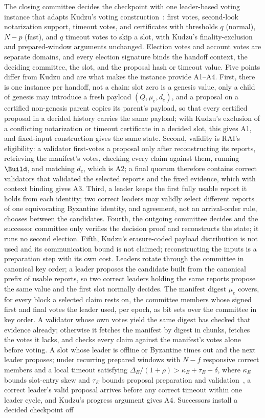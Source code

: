 The closing committee decides the checkpoint with one leader-based voting instance that adapts Kudzu's voting construction~\cite{kudzu}: first votes, second-look notarization support, timeout votes, and certificates with thresholds $q$ (normal), $N-p$ (fast), and $q$ timeout votes to skip a slot, with Kudzu's finality-exclusion and prepared-window arguments unchanged. Election votes and account votes are separate domains, and every election signature binds the handoff context, the deciding committee, the slot, and the proposal hash or timeout value. Five points differ from Kudzu and are what makes the instance provide A1--A4. First, there is one instance per handoff, not a chain: slot zero is a genesis value, only a child of genesis may introduce a fresh payload $(Q,\mu_e,d_e)$, and a proposal on a certified non-genesis parent copies its parent's payload, so that every certified proposal in a decided history carries the same payload; with Kudzu's exclusion of a conflicting notarization or timeout certificate in a decided slot, this gives A1, and fixed-input construction gives the same state. Second, validity is RAI's eligibility: a validator first-votes a proposal only after reconstructing its reports, retrieving the manifest's votes, checking every claim against them, running $\Build$, and matching $d_e$, which is A2; a final quorum therefore contains correct validators that validated the selected reports and the fixed evidence, which with context binding gives A3. Third, a leader keeps the first fully usable report it holds from each identity; two correct leaders may validly select different reports of one equivocating Byzantine identity, and agreement, not an arrival-order rule, chooses between the candidates. Fourth, the outgoing committee decides and the successor committee only verifies the decision proof and reconstructs the state; it runs no second election. Fifth, Kudzu's erasure-coded payload distribution is not used and its communication bound is not claimed; reconstructing the inputs is a preparation step with its own cost. Leaders rotate through the committee in canonical key order; a leader proposes the candidate built from the canonical prefix of usable reports, so two correct leaders holding the same reports propose the same value and the first slot normally decides. The manifest digest $\mu_e$ covers, for every block a selected claim rests on, the committee members whose signed first and final votes the leader used, per epoch, as bit sets over the committee in key order. A validator whose own votes yield the same digest has checked that evidence already; otherwise it fetches the manifest by digest in chunks, fetches the votes it lacks, and checks every claim against the manifest's votes alone before voting. A slot whose leader is offline or Byzantine times out and the next leader proposes; under recurring prepared windows with $N-f$ responsive correct members and a local timeout satisfying $\Delta_E/(1+\rho)>\kappa_E+\tau_E+\delta$, where $\kappa_E$ bounds slot-entry skew and $\tau_E$ bounds proposal preparation and validation~\cite{dls}, a correct leader's valid proposal arrives before any correct timeout within one leader cycle, and Kudzu's progress argument gives A4. Successors install a decided checkpoint off 